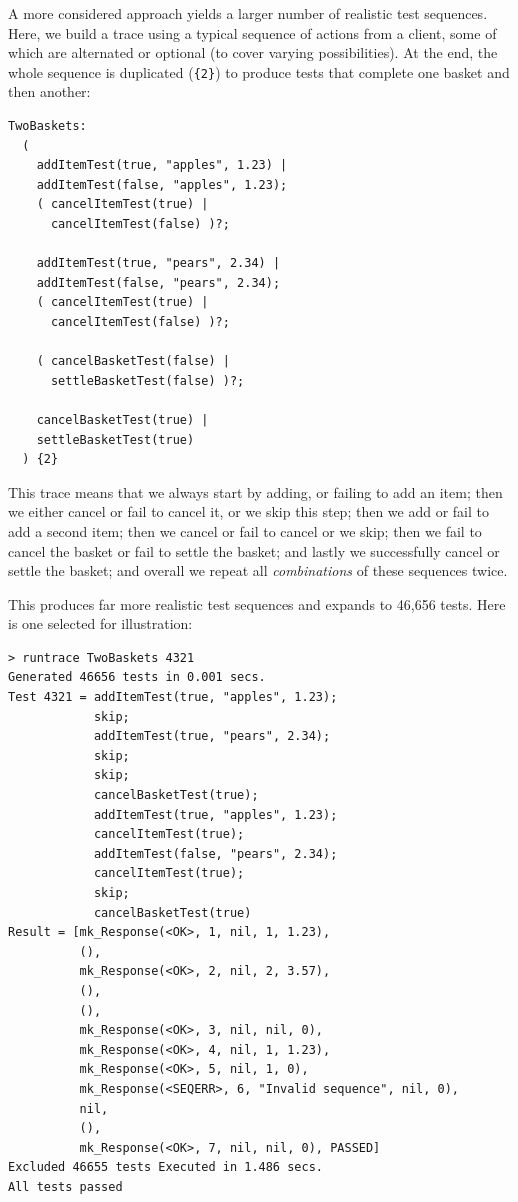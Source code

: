 \documentclass{overturerepchap}
\begin{document}
A more considered approach yields a larger number of realistic test sequences.
Here, we build a trace using a typical sequence of actions from a client, some
of which are alternated or optional (to cover varying possibilities). At the
end, the whole sequence is duplicated (\texttt{\{2\}}) to produce tests that
complete one basket and then another:

\small
\begin{lstlisting}
TwoBaskets:
  (
    addItemTest(true, "apples", 1.23) |
    addItemTest(false, "apples", 1.23);
    ( cancelItemTest(true) |
      cancelItemTest(false) )?;

    addItemTest(true, "pears", 2.34) |
    addItemTest(false, "pears", 2.34);
    ( cancelItemTest(true) |
      cancelItemTest(false) )?;

    ( cancelBasketTest(false) |
      settleBasketTest(false) )?;

    cancelBasketTest(true) |
    settleBasketTest(true)
  ) {2}
\end{lstlisting}
\normalsize

\noindent This trace means that we always start by adding, or failing to add an
item; then we either cancel or fail to cancel it, or we skip this step; then we
add or fail to add a second item; then we cancel or fail to cancel or we skip;
then we fail to cancel the basket or fail to settle the basket; and lastly we
successfully cancel or settle the basket; and overall we repeat all
\emph{combinations} of these sequences twice.

This produces far more realistic test sequences and expands to 46,656 tests.
Here is one selected for illustration:

\scriptsize
\lstset{style=tool,language=}
\begin{lstlisting}
> runtrace TwoBaskets 4321
Generated 46656 tests in 0.001 secs. 
Test 4321 = addItemTest(true, "apples", 1.23);
            skip;
            addItemTest(true, "pears", 2.34);
            skip;
            skip;
            cancelBasketTest(true);
            addItemTest(true, "apples", 1.23);
            cancelItemTest(true);
            addItemTest(false, "pears", 2.34);
            cancelItemTest(true);
            skip;
            cancelBasketTest(true)
Result = [mk_Response(<OK>, 1, nil, 1, 1.23),
          (),
          mk_Response(<OK>, 2, nil, 2, 3.57),
          (),
          (),
          mk_Response(<OK>, 3, nil, nil, 0),
          mk_Response(<OK>, 4, nil, 1, 1.23),
          mk_Response(<OK>, 5, nil, 1, 0),
          mk_Response(<SEQERR>, 6, "Invalid sequence", nil, 0),
          nil,
          (),
          mk_Response(<OK>, 7, nil, nil, 0), PASSED]
Excluded 46655 tests Executed in 1.486 secs.
All tests passed
\end{lstlisting}
\normalsize
\end{document}
